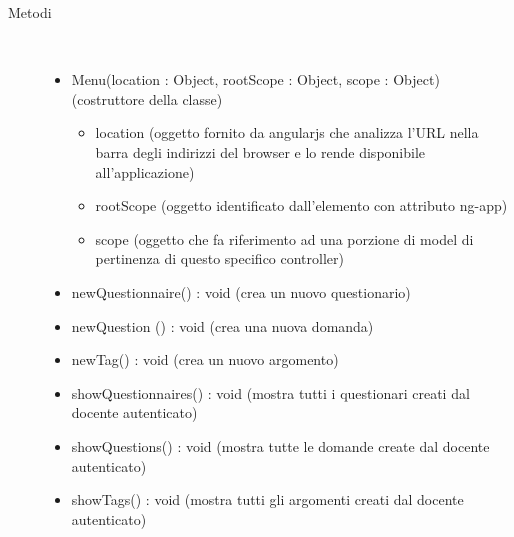 \begin{description}
\item[Metodi] \hfill \\
 \vspace{-7mm}
\begin{itemize}
\item Menu(location : Object, rootScope : Object, scope : Object) (costruttore della classe)\begin{itemize}
\item location (oggetto fornito da angularjs che analizza l'URL nella barra degli indirizzi del browser e lo rende disponibile all'applicazione)
\item rootScope (oggetto identificato dall’elemento con attributo ng-app)
\item scope (oggetto che fa riferimento ad una porzione di model di pertinenza di questo specifico controller)
\end{itemize}

\item newQuestionnaire() : void (crea un nuovo questionario)
\item newQuestion () : void (crea una nuova domanda)
\item newTag() : void (crea un nuovo argomento)
\item showQuestionnaires() : void (mostra tutti i questionari creati dal docente autenticato)
\item showQuestions() : void (mostra tutte le domande create dal docente autenticato)
\item showTags() : void (mostra tutti gli argomenti creati dal docente autenticato)
\end{itemize}

\end{description}

